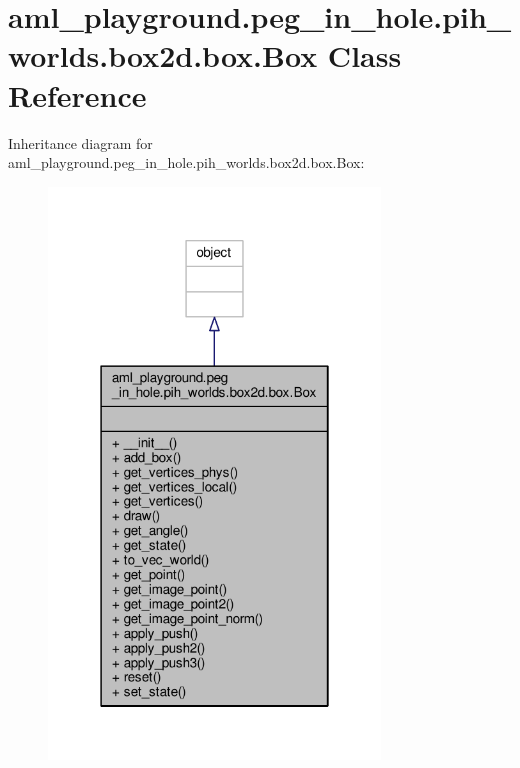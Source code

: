 \hypertarget{classaml__playground_1_1peg__in__hole_1_1pih__worlds_1_1box2d_1_1box_1_1_box}{\section{aml\-\_\-playground.\-peg\-\_\-in\-\_\-hole.\-pih\-\_\-worlds.\-box2d.\-box.\-Box Class Reference}
\label{classaml__playground_1_1peg__in__hole_1_1pih__worlds_1_1box2d_1_1box_1_1_box}
}


Inheritance diagram for aml\-\_\-playground.\-peg\-\_\-in\-\_\-hole.\-pih\-\_\-worlds.\-box2d.\-box.\-Box\-:\nopagebreak
\begin{figure}[H]
\begin{center}
\leavevmode
\includegraphics[width=250pt]{classaml__playground_1_1peg__in__hole_1_1pih__worlds_1_1box2d_1_1box_1_1_box__inherit__graph}
\end{center}
\end{figure}


